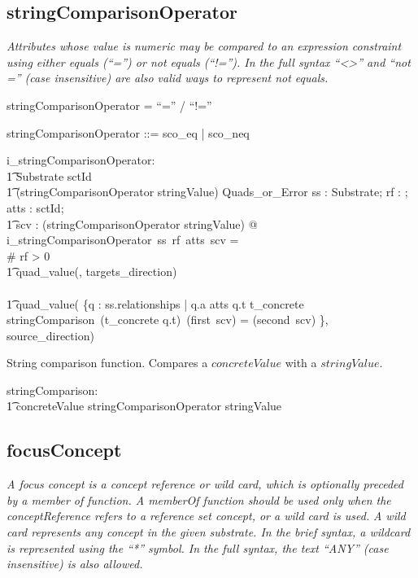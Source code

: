 \documentclass{article}
\def\bnf#1{{\scriptsize {{#1}} }}
\def\desc#1{{\small \textsl{{#1}} }}
\begin{document}
\subsection{stringComparisonOperator}
\begin{framed}
\desc{Attributes whose value is numeric may be compared to an expression constraint using either equals (``='') or not equals (``!=''). In the full syntax ``<>'' and ``not ='' (case insensitive) are also  valid ways to represent not equals.}
\end{framed}

\begin{framed}
\noindent
\bnf{stringComparisonOperator = ``='' / ``!=''}
\end{framed}


\begin{zed}
stringComparisonOperator ::= sco\_eq | sco\_neq
\end{zed}

\begin{axdef}
   i\_stringComparisonOperator: \\
\t1 Substrate \fun  \optional[reverseFlag] \fun \power sctId \fun \\
\t1 (stringComparisonOperator \cross stringValue) \fun Quads\_or\_Error
\where
    \forall ss : Substrate; rf : \optional[reverseFlag]; atts : \power sctId; \\
\t1 scv : (stringComparisonOperator \cross stringValue)  @ \\
    i\_stringComparisonOperator~ss~rf~atts~scv = \\
\IF \# rf > 0 \THEN \\
\t1 quad\_value(\emptyset, targets\_direction) \\
\ELSE \\
\t1 quad\_value( \{q : ss.relationships | q.a \in atts \land q.t \in \ran t\_concrete \land \\
stringComparison~(t\_concrete \inv q.t)~(first~scv) = (second~scv) \}, source\_direction)
 \end{axdef}


 String comparison function. Compares a $concreteValue$ with a $stringValue$.
 \begin{axdef}
    stringComparison: \\
\t1 concreteValue \fun stringComparisonOperator \pfun stringValue
 \end{axdef}





\subsection{focusConcept}
\begin{framed}
\desc{A focus concept is a concept reference or wild card, which is optionally preceded by a member of function. A memberOf function should be used only when the conceptReference refers to a reference set concept, or a wild card is used.}
\desc{A wild card represents any concept in the given substrate. In the brief syntax, a wildcard is represented using the ``*'' symbol. In the full syntax, the text ``ANY'' (case insensitive) is also allowed.}
\end{framed}
\end{document}
